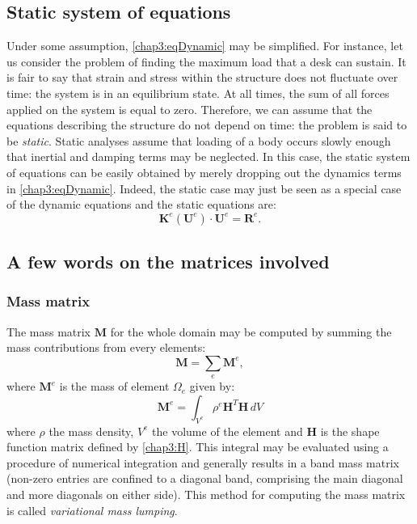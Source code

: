 	\subsection{Static system of equations}	\label{chap3:static}
Under some assumption, \eqref{chap3:eqDynamic} may be simplified. For instance, let us consider the problem of finding the maximum load that a desk can sustain. It is fair to say that strain and stress within the structure does not fluctuate over time: the system is in an equilibrium state. At all times, the sum of all forces applied on the system is equal to zero. Therefore, we can assume that the equations describing the structure do not depend on time: the problem is said to be \emph{static}. Static analyses assume that loading of a body occurs slowly enough that inertial and damping terms may be neglected. In this case, the static system of equations can be easily obtained by merely dropping out the dynamics terms in \eqref{chap3:eqDynamic}. Indeed, the static case may just be seen as a special case of the dynamic equations and the static equations are:
\begin{equation}
\label{chap3:eqStatic}
\mathbf{K}^e (\mathbf{U}^e ) \cdot \mathbf{U}^e  = \mathbf{R}^e .
\end{equation}

	\subsection{A few words on the matrices involved} \label{chap3:wordOnMatrices}
		
		\subsubsection*{Mass matrix}
The mass matrix $ \mathbf{M} $ for the whole domain may be computed by summing the mass contributions from every elements:
\begin{equation}
\mathbf{M} = \sum_e \mathbf{M}^e,
\end{equation}
where $ \mathbf{M}^e $ is the mass of element $ \Omega_e $ given by:
\begin{equation}
\mathbf{M}^e = \int_{V^e} \rho^e \mathbf{H}^T \mathbf{H} \, dV
\end{equation}
where $ \rho $ the mass density, $ V^e $ the volume of the element and $ \mathbf{H} $ is the shape function matrix defined by \eqref{chap3:H}. This integral may be evaluated using a procedure of numerical integration and generally results in a band mass matrix (non-zero entries are confined to a diagonal band, comprising the main diagonal and more diagonals on either side). This method for computing the mass matrix is called \emph{variational mass lumping}.

